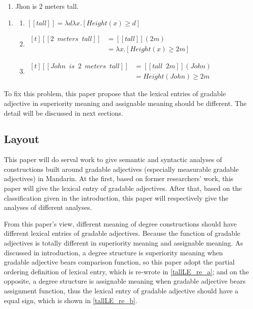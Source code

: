\documentclass{ctexart}
\begin{document}
\begin{enumerate}
    \item \label{john_gao_2_mi} Jhon is 2 meters tall.
\end{enumerate}

\begin{enumerate}
    \item \label{john_gao_2_mi_LE}
    
    \begin{enumerate}
    \item \label{john_gao_2_mi_LE_a} 
    $[\![tall]\!] = \lambda d \lambda x.[Height(x) \geq d]$
    
    \item \label{john_gao_2_mi_LE_b} 
    $\begin{aligned}[t]
        [\![2 \enspace meters \enspace tall]\!] &= [\![tall]\!](2m) \\
        &= \lambda x.[Height(x) \geq 2m]
    \end{aligned}$
    
    \item \label{john_gao_2_mi_LE_c} 
    $\begin{aligned}[t]
        [\![John \enspace is \enspace 2 \enspace meters \enspace tall]\!] &= [\![tall \enspace 2m]\!](John) \\
        &= Height(John) \geq 2m
    \end{aligned}$
    
    \end{enumerate}
\end{enumerate}

To fix this problem, this paper propose that the lexical entries of gradable adjective in superiority meaning and assignable meaning should be different. The detail will be discussed in next sections.

\subsection{Layout}

\noindent
This paper will do serval work to give semantic and syntactic analyses of constructions built around gradable adjectives (especially measurable gradable adjectives) in Mandarin. At the first, based on former researchers' work, this paper will give the lexical entry of gradable adjectives. After that, based on the classification given in the introduction, this paper will respectively give the analyses of different analyses.

From this paper's view, different meaning of degree constructions should have different lexical entries of gradable adjectives. Because the function of gradable adjectives is totally different in superiority meaning and assignable meaning. As discussed in introduction, a degree structure is superiority meaning when gradable adjective bears comparison function, so this paper adopt the partial ordering definition of lexical entry, which is re-wrote in \ref{tallLE_re_a}; and on the opposite, a degree structure is assignable meaning when gradable adjective bears assignment function, thus the lexical entry of gradable adjective should have a equal sign, which is shown in \ref{tallLE_re_b}.
\end{document}
